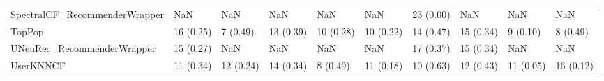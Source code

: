 \begin{tabular}{llllllllll}
      SpectralCF\_RecommenderWrapper &                      NaN &         NaN &           NaN &          NaN &                  NaN &           23 (0.00) &               NaN &                NaN &               NaN \\
                             TopPop &                16 (0.25) &    7 (0.49) &     13 (0.39) &    10 (0.28) &            10 (0.22) &           14 (0.47) &         15 (0.34) &           9 (0.10) &          8 (0.49) \\
         UNeuRec\_RecommenderWrapper &                15 (0.27) &         NaN &           NaN &          NaN &                  NaN &           17 (0.37) &         15 (0.34) &                NaN &               NaN \\
                          UserKNNCF &                11 (0.34) &   12 (0.24) &     14 (0.34) &     8 (0.49) &            11 (0.18) &           10 (0.63) &         12 (0.43) &          11 (0.05) &         16 (0.12) \\
\bottomrule
\end{tabular}
